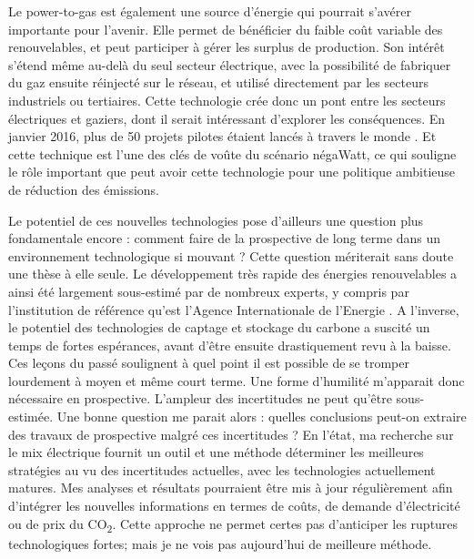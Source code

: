 Le power-to-gas est également une source d’énergie qui pourrait s’avérer importante pour l’avenir. Elle permet de bénéficier du faible coût variable des renouvelables, et peut participer à gérer les surplus de production. Son intérêt s’étend même au-delà du seul secteur électrique, avec la possibilité de fabriquer du gaz ensuite réinjecté sur le réseau, et utilisé directement par les secteurs industriels ou tertiaires. Cette technologie crée donc un pont entre les secteurs électriques et gaziers, dont il serait intéressant d’explorer les conséquences. En janvier 2016, plus de 50 projets pilotes étaient lancés à travers le monde \citep{EneaConsulting2016}. Et cette technique est l’une des clés de voûte du scénario négaWatt, ce qui souligne le rôle important que peut avoir cette technologie pour une politique ambitieuse de réduction des émissions.

Le potentiel de ces nouvelles technologies pose d'ailleurs une question plus fondamentale encore : comment faire de la prospective de long terme dans un environnement technologique si mouvant ? Cette question mériterait sans doute une thèse à elle seule. Le développement très rapide des énergies renouvelables a ainsi été largement sous-estimé par de nombreux experts, y compris par l'institution de référence qu'est l'Agence Internationale de l'Energie \citep{Metayer2015, Creutzig2017}. A l'inverse, le potentiel des technologies de captage et stockage du carbone a suscité un temps de fortes espérances, avant d'être ensuite drastiquement revu à la baisse. Ces leçons du passé soulignent à quel point il est possible de se tromper lourdement à moyen et même court terme. Une forme d'humilité m'apparait donc nécessaire en prospective. L'ampleur des incertitudes ne peut qu'être sous-estimée. Une bonne question me parait alors : quelles conclusions peut-on extraire des travaux de prospective malgré ces incertitudes ? 
En l'état, ma recherche sur le mix électrique fournit un outil et une méthode déterminer les meilleures stratégies au vu des incertitudes actuelles, avec les technologies actuellement matures. Mes analyses et résultats pourraient être mis à jour régulièrement afin d’intégrer les nouvelles informations en termes de coûts, de demande d’électricité ou de prix du CO\textsubscript{2}. Cette approche ne permet certes pas d'anticiper les ruptures technologiques fortes; mais je ne vois pas aujourd'hui de meilleure méthode.

